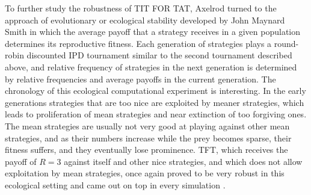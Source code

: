 To further study the robustness of TIT FOR TAT, Axelrod turned to the approach of evolutionary or ecological stability developed by John Maynard Smith in which the average payoff that a strategy receives in a given population determines its reproductive fitness. Each generation of strategies plays a round-robin discounted IPD tournament similar to the second tournament described above, and relative frequency of strategies in the next generation is determined by relative frequencies and average payoffs in the current generation. The chronology of this ecological computational experiment is interesting. In the early generations strategies that are too nice are exploited by meaner strategies, which leads to proliferation of mean strategies and near extinction of too forgiving ones. The mean strategies are usually not very good at playing against other mean strategies, and as their numbers increase while the prey becomes sparse, their fitness suffers, and they eventually lose prominence. TFT, which receives the payoff of $R = 3$ against itself and other nice strategies, and which does not allow exploitation by mean strategies, once again proved to be very robust in this ecological setting and came out on top in every simulation \cite[p.53]{axelrod1984evolution}.

